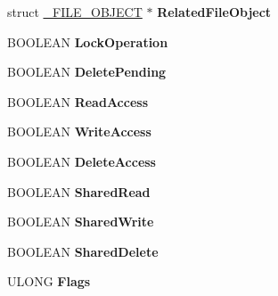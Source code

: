 \begin{DoxyCompactItemize}
\item 
\hypertarget{struct__FILE__OBJECT_a67e2d167241a6d838488cba802a0c559}{}struct \hyperlink{struct__FILE__OBJECT}{\+\_\+\+F\+I\+L\+E\+\_\+\+O\+B\+J\+E\+C\+T} $\ast$ {\bfseries Related\+File\+Object}\label{struct__FILE__OBJECT_a67e2d167241a6d838488cba802a0c559}

\item 
\hypertarget{struct__FILE__OBJECT_a9112b6ae5640d8ced4a3a7d4586b3315}{}B\+O\+O\+L\+E\+A\+N {\bfseries Lock\+Operation}\label{struct__FILE__OBJECT_a9112b6ae5640d8ced4a3a7d4586b3315}

\item 
\hypertarget{struct__FILE__OBJECT_a735ed9ff9868ef8bbf29211fe807939a}{}B\+O\+O\+L\+E\+A\+N {\bfseries Delete\+Pending}\label{struct__FILE__OBJECT_a735ed9ff9868ef8bbf29211fe807939a}

\item 
\hypertarget{struct__FILE__OBJECT_aaf61bed6f2b2f7017d72182b10762a07}{}B\+O\+O\+L\+E\+A\+N {\bfseries Read\+Access}\label{struct__FILE__OBJECT_aaf61bed6f2b2f7017d72182b10762a07}

\item 
\hypertarget{struct__FILE__OBJECT_aa08586913240a682439324dc66452985}{}B\+O\+O\+L\+E\+A\+N {\bfseries Write\+Access}\label{struct__FILE__OBJECT_aa08586913240a682439324dc66452985}

\item 
\hypertarget{struct__FILE__OBJECT_aebcfa3ac90815e440e47b670ca9f6141}{}B\+O\+O\+L\+E\+A\+N {\bfseries Delete\+Access}\label{struct__FILE__OBJECT_aebcfa3ac90815e440e47b670ca9f6141}

\item 
\hypertarget{struct__FILE__OBJECT_ae606c251b1dfb668c0d18f7441898591}{}B\+O\+O\+L\+E\+A\+N {\bfseries Shared\+Read}\label{struct__FILE__OBJECT_ae606c251b1dfb668c0d18f7441898591}

\item 
\hypertarget{struct__FILE__OBJECT_a75bf9dd30fed1b89695d923993e4a7de}{}B\+O\+O\+L\+E\+A\+N {\bfseries Shared\+Write}\label{struct__FILE__OBJECT_a75bf9dd30fed1b89695d923993e4a7de}

\item 
\hypertarget{struct__FILE__OBJECT_aed1bf02d3c72760ad7b7f20afe1d30f2}{}B\+O\+O\+L\+E\+A\+N {\bfseries Shared\+Delete}\label{struct__FILE__OBJECT_aed1bf02d3c72760ad7b7f20afe1d30f2}

\item 
\hypertarget{struct__FILE__OBJECT_a60e6abed66502685b7bd1744c972468f}{}U\+L\+O\+N\+G {\bfseries Flags}\label{struct__FILE__OBJECT_a60e6abed66502685b7bd1744c972468f}


\end{DoxyCompactItemize}
